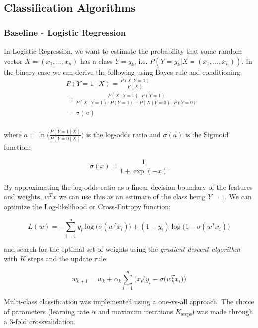 \documentclass[conference]{IEEEtran}
\begin{document}
\subsection{Classification Algorithms}

\subsubsection{Baseline - Logistic Regression}
In Logistic Regression, we want to estimate the probability that some random vector $X=(x_1, \ldots, x_n)$ has a class $Y=y_k$, i.e. $P(Y=y_k | X=(x_1, \ldots, x_n))$. In the binary case we can derive the following using Bayes rule and conditioning:
\begin{equation*}
\begin{split}
&P(Y=1~|~X) = \frac{P(X, Y=1)}{P(X)}\\
&= \frac{ P(X~|~Y=1)\cdot P(Y=1) }{ P(X~|~Y=1)\cdot P(Y=1) + P(X~|~Y=0)\cdot P(Y=0) }\\
& = \sigma(a)\\
\end{split}
\end{equation*}

where $a=\ln\Big(\frac{P(Y=1~|~X)}{P(Y=0~|~X)}\Big)$ is the log-odds ratio and $\sigma (a)$ is the Sigmoid function:

\begin{equation}
	\label{sig}
	\sigma (x)= \frac{1}{1 + \exp{(-x)}} 
\end{equation}

By approximating the log-odds ratio as a linear decision boundary of the features and weights, $w^T x$ we can use this as an estimate of the class being $Y=1$. We can optimize the Log-likelihood or Cross-Entropy function:

\begin{equation}
	\label{LL}
	L(w) = -\sum_{i=1}^n y_i\log\Big(\sigma(w^Tx_i)\Big) + (1-y_i)\log\Big(1-\sigma(w^Tx_i)\Big)
\end{equation}

and search for the optimal set of weights using the \emph{gradient descent algorithm} with $K$ steps and the update rule:

\begin{equation}
\label{LR_update_rule}
	w_{k+1} = w_k + \alpha_k \sum_{i=1}^n \Big( x_i\big(y_i - \sigma(w_k^Tx_i\big) \Big)
\end{equation}

Multi-class classification was implemented using a one-vs-all approach. The choice of parameters (learning rate $\alpha$ and maximum iterations $K_\text{steps}$) was made through a 3-fold crossvalidation.
\end{document}
